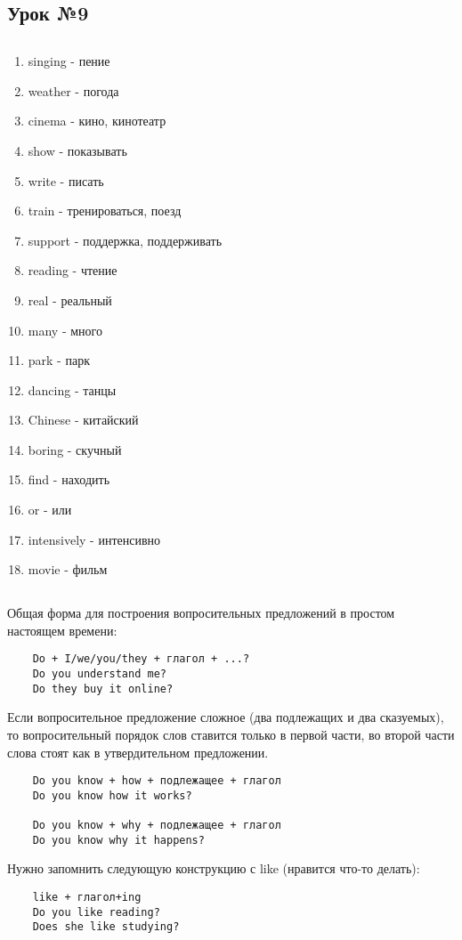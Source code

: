 \subsection{Урок №9}

\subsection*{}
\begin{multicols}{2}
    \begin{enumerate}\setlength{\itemsep}{0pt}
        \item singing - пение
        \item weather - погода
        \item cinema - кино, кинотеатр
        \item show - показывать
        \item write - писать
        \item train - тренироваться, поезд
        \item support - поддержка, поддерживать
        \item reading - чтение
        \item real - реальный
        \item many - много
        \item park - парк
        \item dancing - танцы
        \item Chinese - китайский
        \item boring - скучный
        \item find - находить
        \item or - или
        \item intensively - интенсивно
        \item movie - фильм
    \end{enumerate}
\end{multicols}

\subsection*{}
Общая форма для построения вопросительных предложений в простом настоящем времени:
\begin{verbatim}
    Do + I/we/you/they + глагол + ...?
    Do you understand me?
    Do they buy it online?
\end{verbatim}

Если вопросительное предложение сложное (два подлежащих и два сказуемых), то вопросительный порядок
слов ставится только в первой части, во второй части слова стоят как в утвердительном предложении.
\begin{verbatim}
    Do you know + how + подлежащее + глагол
    Do you know how it works?

    Do you know + why + подлежащее + глагол
    Do you know why it happens?
\end{verbatim}

Нужно запомнить следующую конструкцию с like (нравится что-то делать):
\begin{verbatim}
    like + глагол+ing
    Do you like reading?
    Does she like studying?
\end{verbatim}